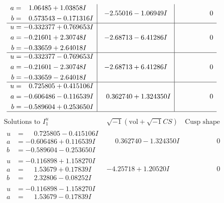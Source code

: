 \documentclass[1p]{elsarticle_modified}
\theoremstyle{definition}
\newcommand{\I}{\sqrt{-1}}
\begin{document}
$$\begin{array}{c|c|c}
\begin{aligned}
a &= \phantom{-}1.06485 + 1.03858 I \\
b &= \phantom{-}0.573543 - 0.171316 I\end{aligned}
 & -2.55016 - 1.06949 I & \phantom{-0.000000 } 0 \\ \hline\begin{aligned}
u &= -0.332377 + 0.769653 I \\
a &= -0.21601 + 2.30748 I \\
b &= -0.33659 + 2.64018 I\end{aligned}
 & -2.68713 - 6.41286 I & \phantom{-0.000000 } 0 \\ \hline\begin{aligned}
u &= -0.332377 - 0.769653 I \\
a &= -0.21601 - 2.30748 I \\
b &= -0.33659 - 2.64018 I\end{aligned}
 & -2.68713 + 6.41286 I & \phantom{-0.000000 } 0 \\ \hline\begin{aligned}
u &= \phantom{-}0.725805 + 0.415106 I \\
a &= -0.606486 - 0.116539 I \\
b &= -0.589604 + 0.253650 I\end{aligned}
 & \phantom{-}0.362740 + 1.324350 I & \phantom{-0.000000 } 0\\
 \hline 
 \end{array}$$\newpage$$\begin{array}{c|c|c}  
\text{Solutions to }I^u_{1}& \I (\text{vol} + \sqrt{-1}CS) & \text{Cusp shape}\\
 \hline 
\begin{aligned}
u &= \phantom{-}0.725805 - 0.415106 I \\
a &= -0.606486 + 0.116539 I \\
b &= -0.589604 - 0.253650 I\end{aligned}
 & \phantom{-}0.362740 - 1.324350 I & \phantom{-0.000000 } 0 \\ \hline\begin{aligned}
u &= -0.116898 + 1.158270 I \\
a &= \phantom{-}1.53679 + 0.17839 I \\
b &= \phantom{-}2.32806 - 0.08252 I\end{aligned}
 & -4.25718 + 1.20520 I & \phantom{-0.000000 } 0 \\ \hline\begin{aligned}
u &= -0.116898 - 1.158270 I \\
a &= \phantom{-}1.53679 - 0.17839 I \\

\end{aligned}
\end{array}$$
\end{document}
